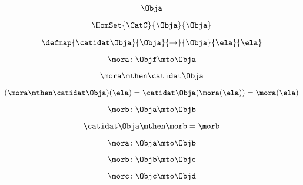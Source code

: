 \begin{forslides}
    \begin{equation}
        \label{eq:semicats-slides-87}
        \Obja
    \end{equation}

    \begin{equation}
        \label{eq:semicats-slides-88}
        \HomSet{\CatC}{\Obja}{\Obja}
    \end{equation}

    \begin{equation}
        \label{eq:semicats-slides-89}
        \defmap{
            \catidat\Obja
        }{
            \Obja
        }{
            \to
        }{
            \Obja
        }{
            \ela
        }{
            \ela
        }
    \end{equation}

    \begin{equation}
        \label{eq:semicats-slides-90}
        \mora \colon \Objf \mto \Obja
    \end{equation}

    \begin{equation}
        \label{eq:semicats-slides-91}
        \mora \mthen \catidat\Obja
    \end{equation}

    \begin{equation}
        \label{eq:semicats-slides-92}
        (\mora \mthen \catidat\Obja)(\ela)
        = \catidat\Obja(\mora (\ela)) = \mora (\ela)
    \end{equation}

    \begin{equation}
        \label{eq:semicats-slides-93}
        \morb \colon \Obja \mto \Objb
    \end{equation}

    \begin{equation}
        \label{eq:semicats-slides-94}
        \catidat\Obja \mthen \morb = \morb
    \end{equation}

    \begin{equation}
        \label{eq:semicats-slides-95}
        \mora \colon \Obja \mto \Objb
    \end{equation}

    \begin{equation}
        \label{eq:semicats-slides-96}
        \morb\colon \Objb \mto \Objc
    \end{equation}

    \begin{equation}
        \label{eq:semicats-slides-97}
        \morc \colon \Objc \mto \Objd
    \end{equation}


\end{forslides}
